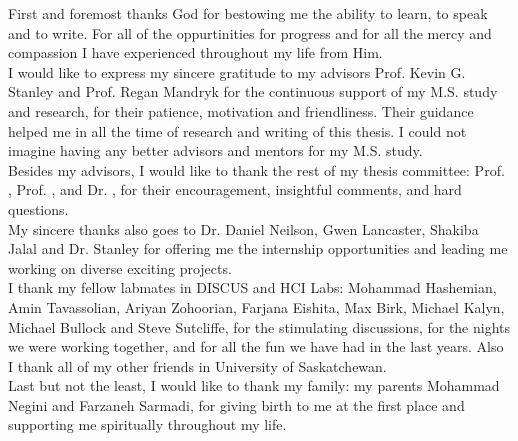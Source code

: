 First and foremost thanks God for bestowing me the ability to
learn, to speak and to write. For all of the oppurtinities for progress and
for all the mercy and compassion I have experienced throughout my life from Him.\\

I would like to express my sincere gratitude to my advisors 
Prof. Kevin G. Stanley and Prof. Regan Mandryk for the continuous support of my M.S. study and research,
for their patience, motivation and friendliness.
Their guidance helped me in all the time of research and writing of this thesis.
I could not imagine having any better advisors and mentors for my M.S. study.\\

Besides my advisors, I would like to thank the rest of my thesis
committee: Prof. , Prof. , and Dr. , for their 
encouragement, insightful comments, and hard questions.\\

My sincere thanks also goes to Dr. Daniel Neilson, Gwen Lancaster,
Shakiba Jalal and Dr. Stanley for offering me the internship opportunities
and leading me working on diverse exciting projects.\\

I thank my fellow labmates in DISCUS and HCI Labs: Mohammad Hashemian, Amin Tavassolian,
Ariyan Zohoorian, Farjana Eishita, Max Birk, Michael Kalyn, Michael Bullock and Steve Sutcliffe,
for the stimulating discussions, for the nights we were working together,
and for all the fun we have had in the last years.
Also I thank all of my other friends in University of Saskatchewan.\\

Last but not the least, I would like to thank my family: my parents Mohammad Negini and
Farzaneh Sarmadi, for giving birth to me at the first place and supporting me spiritually
throughout my life.\\
